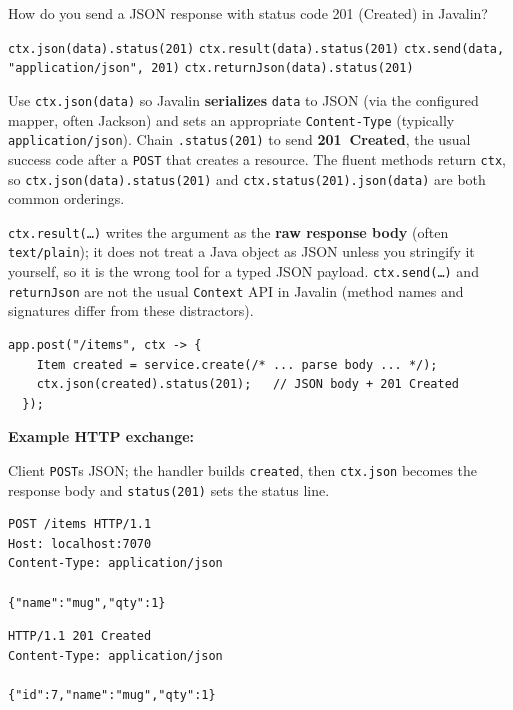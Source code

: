 \question[4]
How do you send a JSON response with status code 201 (Created) in Javalin?
\begin{choices}
  \CorrectChoice \texttt{ctx.json(data).status(201)}
  \choice \texttt{ctx.result(data).status(201)}
  \choice \texttt{ctx.send(data, "application/json", 201)}
  \choice \texttt{ctx.returnJson(data).status(201)}
\end{choices}
\begin{solution}
  Use \texttt{ctx.json(data)} so Javalin \textbf{serializes} \texttt{data} to JSON (via the configured mapper, often Jackson) and sets an appropriate \texttt{Content-Type} (typically \texttt{application/json}). Chain \texttt{.status(201)} to send \textbf{201~Created}, the usual success code after a \texttt{POST} that creates a resource. The fluent methods return \texttt{ctx}, so \texttt{ctx.json(data).status(201)} and \texttt{ctx.status(201).json(data)} are both common orderings.

  \texttt{ctx.result(\ldots)} writes the argument as the \textbf{raw response body} (often \texttt{text/plain}); it does not treat a Java object as JSON unless you stringify it yourself, so it is the wrong tool for a typed JSON payload. \texttt{ctx.send(\ldots)} and \texttt{returnJson} are not the usual \texttt{Context} API in Javalin (method names and signatures differ from these distractors).

  \begin{lstlisting}[style=javaexam]
  app.post("/items", ctx -> {
    Item created = service.create(/* ... parse body ... */);
    ctx.json(created).status(201);   // JSON body + 201 Created
  });
  \end{lstlisting}

  \noindent\textbf{Example HTTP exchange:}\par
  \noindent Client \texttt{POST}s JSON; the handler builds \texttt{created}, then \texttt{ctx.json} becomes the response body and \texttt{status(201)} sets the status line.\par
  \begin{httpexchange}
\begin{lstlisting}[style=http]
POST /items HTTP/1.1
Host: localhost:7070
Content-Type: application/json

{"name":"mug","qty":1}
\end{lstlisting}
\httpmidarrows
\begin{lstlisting}[style=http]
HTTP/1.1 201 Created
Content-Type: application/json

{"id":7,"name":"mug","qty":1}
\end{lstlisting}
  \end{httpexchange}
\end{solution}

